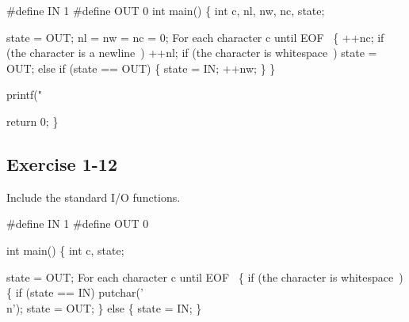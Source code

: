 \nwenddocs{}\plusendmoddef
#define IN  1
#define OUT 0
\eatline
{}\eatline
{}\nwendcode{}\nwdocspar
\nwenddocs{}\plusendmoddef
int main()
\{
    int c, nl, nw, nc, state;

    state = OUT;
    nl = nw = nc = 0;
    \LA{}For each character \code{}c\edoc{} until \code{}EOF\edoc{}~{\nwtagstyle{}}\RA{} \{
        ++nc;
        if (\LA{}the character is a newline~{\nwtagstyle{}}\RA{})
            ++nl;
        if (\LA{}the character is whitespace~{\nwtagstyle{}}\RA{})
            state = OUT;
        else if (state == OUT) \{
          state = IN;
          ++nw;
        \}
    \}

    printf("%

    return 0;
\}
\nwendcode{}\nwdocspar
\nwenddocs{}\subsection{Exercise 1-12}

\nwenddocs{}\endmoddef{}
\LA{}Include the standard I/O functions.~{\nwtagstyle{}}\RA{}


#define IN    1
#define OUT   0


int main()
\{
    int c, state;

    state = OUT;
    \LA{}For each character \code{}c\edoc{} until \code{}EOF\edoc{}~{\nwtagstyle{}}\RA{} \{
        if (\LA{}the character is whitespace~{\nwtagstyle{}}\RA{}) \{
            if (state == IN)
                putchar('\\n');
            state = OUT;
        \} else \{
            state = IN;
        \}

